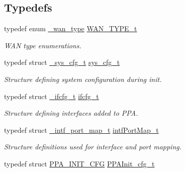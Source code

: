 \subsection*{Typedefs}
\begin{DoxyCompactItemize}
\item 
\hypertarget{group__FAPI__SYSTEM_ga3ad40ceee4008665be22b54298c37de0}{typedef enum \hyperlink{group__FAPI__SYSTEM_ga5ac076a433de0da07d20d9cc9b3623d2}{\-\_\-wan\-\_\-type} \hyperlink{group__FAPI__SYSTEM_ga3ad40ceee4008665be22b54298c37de0}{W\-A\-N\-\_\-\-T\-Y\-P\-E\-\_\-t}}\label{group__FAPI__SYSTEM_ga3ad40ceee4008665be22b54298c37de0}

\begin{DoxyCompactList}\small\item\em W\-A\-N type enumerations. \end{DoxyCompactList}\item 
\hypertarget{group__FAPI__SYSTEM_ga67fc6ffc6cd31f4651e4354a82f894bd}{typedef struct \hyperlink{struct__sys__cfg__t}{\-\_\-sys\-\_\-cfg\-\_\-t} \hyperlink{group__FAPI__SYSTEM_ga67fc6ffc6cd31f4651e4354a82f894bd}{sys\-\_\-cfg\-\_\-t}}\label{group__FAPI__SYSTEM_ga67fc6ffc6cd31f4651e4354a82f894bd}

\begin{DoxyCompactList}\small\item\em Structure defining system configuration during init. \end{DoxyCompactList}\item 
\hypertarget{group__FAPI__SYSTEM_gadd6c781fa3192f45f3f65e2ed2882d6b}{typedef struct \hyperlink{struct__ifcfg__t}{\-\_\-ifcfg\-\_\-t} \hyperlink{group__FAPI__SYSTEM_gadd6c781fa3192f45f3f65e2ed2882d6b}{ifcfg\-\_\-t}}\label{group__FAPI__SYSTEM_gadd6c781fa3192f45f3f65e2ed2882d6b}

\begin{DoxyCompactList}\small\item\em Structure defining interfaces added to P\-P\-A. \end{DoxyCompactList}\item 
\hypertarget{group__FAPI__SYSTEM_ga315d06c934aab7a40816b11db32c772b}{typedef struct \hyperlink{struct__intf__port__map__t}{\-\_\-intf\-\_\-port\-\_\-map\-\_\-t} \hyperlink{group__FAPI__SYSTEM_ga315d06c934aab7a40816b11db32c772b}{intf\-Port\-Map\-\_\-t}}\label{group__FAPI__SYSTEM_ga315d06c934aab7a40816b11db32c772b}

\begin{DoxyCompactList}\small\item\em Structure definitions used for interface and port mapping. \end{DoxyCompactList}\item 
\hypertarget{group__FAPI__SYSTEM_gac5554359c4faf9e76d67a5d7f4144b3d}{typedef struct \hyperlink{structPPA__INIT__CFG}{P\-P\-A\-\_\-\-I\-N\-I\-T\-\_\-\-C\-F\-G} \hyperlink{group__FAPI__SYSTEM_gac5554359c4faf9e76d67a5d7f4144b3d}{P\-P\-A\-Init\-\_\-cfg\-\_\-t}}\label{group__FAPI__SYSTEM_gac5554359c4faf9e76d67a5d7f4144b3d}


\end{DoxyCompactItemize}
